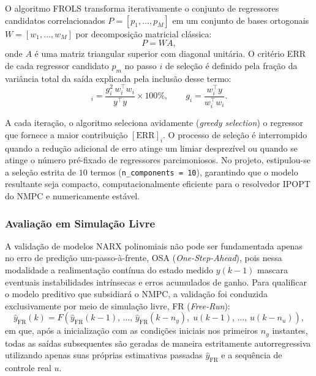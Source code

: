 O algoritmo FROLS transforma iterativamente o conjunto de regressores candidatos correlacionados $P = [p_1, \ldots, p_M]$ em um conjunto de bases ortogonais $W = [w_1, \ldots, w_M]$ por decomposição matricial clássica:
\begin{equation}
    P = W A,
\end{equation}
\noindent onde $A$ é uma matriz triangular superior com diagonal unitária. O critério ERR de cada regressor candidato $p_m$ no passo $i$ de seleção é definido pela fração da variância total da saída explicada pela inclusão desse termo:
\begin{equation}
    [\text{ERR}]_i = \frac{g_i^2 \, w_i^\top w_i}{y^\top y} \times 100\%, \qquad g_i = \frac{w_i^\top y}{w_i^\top w_i}.
    \label{eq:err_criterio}
\end{equation}

A cada iteração, o algoritmo seleciona avidamente (\textit{greedy selection}) o regressor que fornece a maior contribuição $[\text{ERR}]_i$. O processo de seleção é interrompido quando a redução adicional de erro atinge um limiar desprezível ou quando se atinge o número pré-fixado de regressores parcimoniosos. No projeto, estipulou-se a seleção estrita de $10$ termos (\texttt{n\_components = 10}), garantindo que o modelo resultante seja compacto, computacionalmente eficiente para o resolvedor IPOPT do NMPC e numericamente estável.

\subsubsection{Avaliação em Simulação Livre}

A validação de modelos NARX polinomiais não pode ser fundamentada apenas no erro de predição um-passo-à-frente, OSA (\textit{One-Step-Ahead}), pois nessa modalidade a realimentação contínua do estado medido $y(k-1)$ mascara eventuais instabilidades intrínsecas e erros acumulados de ganho. Para qualificar o modelo preditivo que subsidiará o NMPC, a validação foi conduzida exclusivamente por meio de simulação livre, FR (\textit{Free-Run}):
\begin{equation}
    \hat{y}_{\text{FR}}(k) = F\!\left(\hat{y}_{\text{FR}}(k-1),\,\ldots,\,\hat{y}_{\text{FR}}(k-n_y),\; u(k-1),\,\ldots,\,u(k-n_u)\right),
\end{equation}
\noindent em que, após a inicialização com as condições iniciais nos primeiros $n_y$ instantes, todas as saídas subsequentes são geradas de maneira estritamente autorregressiva utilizando apenas suas próprias estimativas passadas $\hat{y}_{\text{FR}}$ e a sequência de controle real $u$.


